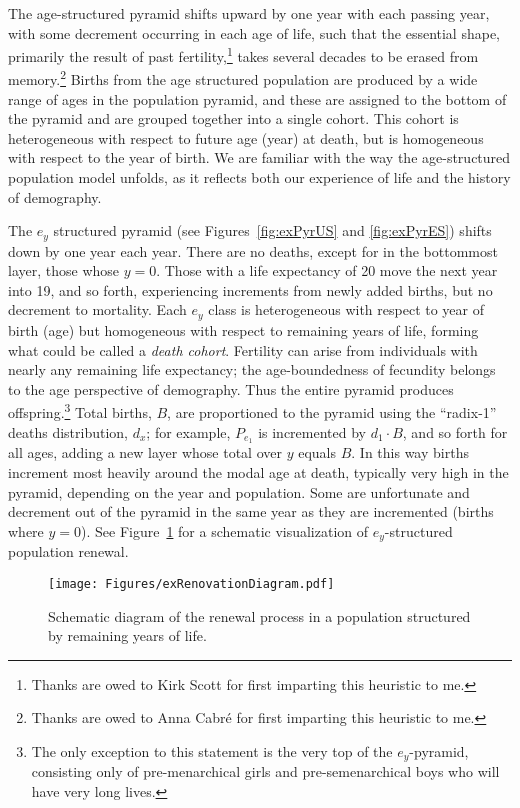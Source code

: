  \FloatBarrier
\label{sec:exrenewal}
The age-structured pyramid shifts upward by one year with
each passing year, with some decrement occurring in each age of life, such that
the essential shape, primarily the result of past fertility,\footnote{Thanks are
owed to Kirk Scott for first imparting this heuristic to me.} takes
several decades to be erased from memory.\footnote{Thanks are owed to Anna Cabr\'{e} for
first imparting this heuristic to me.} Births from the age structured population 
are produced by a wide range of ages in the population pyramid, and these
are assigned to the bottom of the pyramid and are grouped together into a single
cohort. This cohort is heterogeneous with respect to future age (year) at death, 
but is homogeneous with respect to the year of birth. We are familiar with
the way the age-structured population model unfolds, as it
reflects both our experience of life and the history of demography.

The $e_y$ structured pyramid (see Figures~\ref{fig:exPyrUS}
and \ref{fig:exPyrES}) shifts down by one year each year. There are no deaths,
except for in the bottommost layer, those whose $y = 0$. Those with a life
expectancy of 20 move the next year into 19, and so forth, experiencing
increments from newly added births, but no decrement to mortality. 
Each $e_y$ class is heterogeneous with 
respect to year of birth (age) but homogeneous with respect to remaining 
years of life, forming what could be called a \textit{death cohort}. Fertility
can arise from individuals with nearly any remaining life expectancy; the 
age-boundedness of fecundity belongs to the age
perspective of demography. Thus the entire pyramid produces 
offspring.\footnote{The only exception
to this statement is the very top of the $e_y$-pyramid, consisting only of
pre-menarchical girls and pre-semenarchical boys who will have very long
lives.} Total births, $B$, are proportioned to the pyramid using the ``radix-1''
deaths distribution, $d_x$; for example, $P_{e_1}$ is incremented by $d_1 \cdot
B$, and so forth for all ages, adding a new layer whose total over $y$ equals $B$. In 
this way births
increment most heavily around the modal age at death, typically very high in the
pyramid, depending on the year and population. Some are
unfortunate and decrement out of the pyramid in the same year as they are
incremented (births where $y = 0$). See Figure~\ref{fig:exrenewal} for a
schematic visualization of $e_y$-structured population renewal.

\begin{figure}[ht!]
\begin{adjustwidth}{-1in}{1in}
        \centering  
          \caption{Schematic diagram of the renewal process in a population
          structured by remaining years of life.}
           \texttt{[image: Figures/exRenovationDiagram.pdf]}
          \label{fig:exrenewal}
          \end{adjustwidth}
\end{figure}

